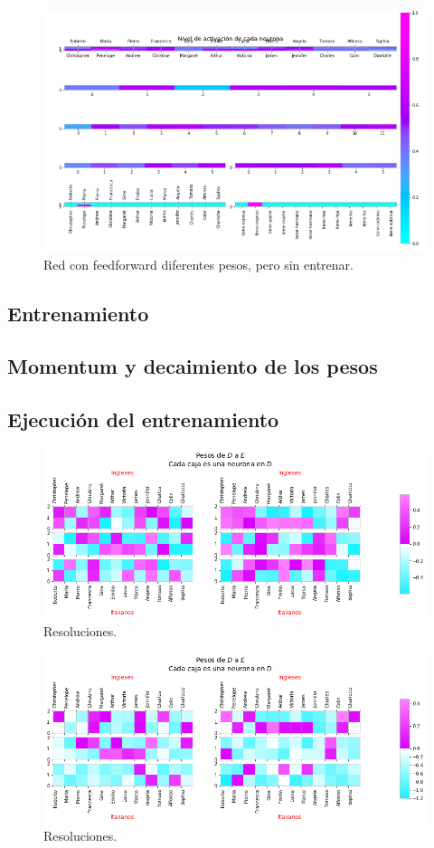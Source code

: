   \begin{figure}[H]
   \centering
   \includegraphics[scale=.5]{../Figuras/Hinton/graficaColores.png}
   \caption{Red con feedforward diferentes pesos, pero sin entrenar.}
  \label{fig:graf}
  \end{figure}

\subsection{Entrenamiento}

\subsection{Momentum y decaimiento de los pesos}

\subsection{Ejecución del entrenamiento}

    \begin{figure}[h]
   \centering
   \includegraphics[scale=.5]{../Figuras/Hinton/r2.png}
   \caption{Resoluciones.}
  \label{fig:r2}
  \end{figure}

    \begin{figure}[h]
   \centering
   \includegraphics[scale=.5]{../Figuras/Hinton/r3.png}
   \caption{Resoluciones.}
  \label{fig:r3}
  \end{figure}


 
